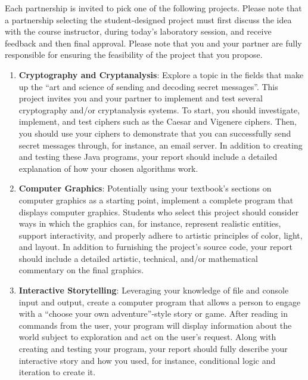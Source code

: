 \documentclass[11pt]{article}
\begin{document}
Each partnership is invited to pick one of the following projects.  Please note that a partnership selecting the
student-designed project must first discuss the idea with the course instructor, during today's laboratory session, and
receive feedback and then final approval. Please note that you and your partner are fully responsible for ensuring the
feasibility of the project that you propose.

\begin{enumerate}

  \item {\bf Cryptography and Cryptanalysis}: Explore a topic in the fields that make up the ``art and science of
    sending and decoding secret messages''. This project invites you and your partner to implement and test several
    cryptography and/or cryptanalysis systems. To start, you should investigate, implement, and test ciphers such as
    the Caesar and Vigenere ciphers. Then, you should use your ciphers to demonstrate that you can successfully send
    secret messages through, for instance, an email server. In addition to creating and testing these Java programs,
    your report should include a detailed explanation of how your chosen algorithms work.

  \item {\bf Computer Graphics}: Potentially using your textbook's sections on computer graphics as a starting point,
    implement a complete program that displays computer graphics. Students who select this project should consider ways
    in which the graphics can, for instance, represent realistic entities, support interactivity, and properly adhere to
    artistic principles of color, light, and layout. In addition to furnishing the project's source code, your report
    should include a detailed artistic, technical, and/or mathematical commentary on the final graphics.

  \item {\bf Interactive Storytelling}: Leveraging your knowledge of file and console input and output, create a
    computer program that allows a person to engage with a ``choose your own adventure''-style story or game. After
    reading in commands from the user, your program will display information about the world subject to exploration and
    act on the user's request. Along with creating and testing your program, your report should fully describe your
    interactive story and how you used, for instance, conditional logic and iteration to create it.


\end{enumerate}
\end{document}
